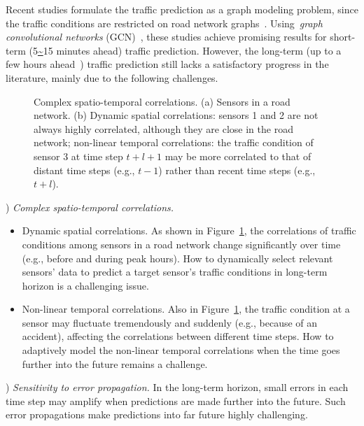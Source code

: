 \documentclass[letterpaper]{article} \usepackage{aaai20}  \usepackage{times}  \usepackage{helvet} \usepackage{courier}  \usepackage[hyphens]{url}  \usepackage{graphicx} \usepackage{amsmath}
\begin{document}
Recent studies formulate the traffic prediction as a graph modeling problem, since the traffic conditions are restricted on road network graphs~\cite{Li-et-al:ICLR2018,Yu-et-al:IJCAI2018,Wu-et-al:IJCAI2019}. Using~\textit{graph convolutional networks} (GCN)~\cite{Defferrard-et-al:NIPS2016}, these studies achieve promising results for short-term (5\url{~}15 minutes ahead) traffic prediction. However, the long-term (up to a few hours ahead~\cite{Hou-and-Li:TITS2016}) traffic prediction still lacks a satisfactory progress in the literature, mainly due to the following challenges.

\begin{figure}
	\centering
	\hspace{0.0 \columnwidth}
	\caption{Complex spatio-temporal correlations. (a) Sensors in a road network. (b) Dynamic spatial correlations: sensors 1 and 2 are not always highly correlated, although they are close in the road network; non-linear temporal correlations: the traffic condition of sensor 3 at time step $ t+l+1 $ may be more correlated to that of distant time steps (e.g., $ t-1 $) rather than recent time steps (e.g., $ t+l $).}
	\label{Figure1} 
\end{figure}

) \textit{Complex spatio-temporal correlations.}
\begin{itemize}
	\item Dynamic spatial correlations. As shown in Figure~\ref{Figure1}, the correlations of traffic conditions among sensors in a road network change significantly over time (e.g., before and during peak hours). How to dynamically select relevant sensors' data to predict a target sensor's traffic conditions in long-term horizon is a challenging issue.
	\item Non-linear temporal correlations. Also in Figure~\ref{Figure1}, the traffic condition at a sensor may fluctuate tremendously and suddenly (e.g., because of an accident), affecting the correlations between different time steps. How to adaptively model the non-linear temporal correlations when the time goes further into the future remains a challenge.
\end{itemize}

) \textit{Sensitivity to error propagation.} In the long-term horizon, small errors in each time step may amplify when predictions are made further into the future. Such error propagations make predictions into far future highly challenging.
\end{document}
